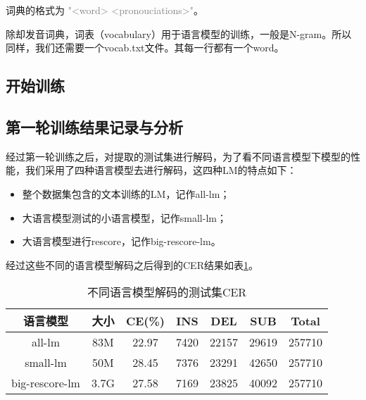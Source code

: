 词典的格式为 \textcolor{gray}{"<word> <pronouciations>"}。

除却发音词典，词表（vocabulary）用于语言模型的训练，一般是N-gram。所以同样，我们还需要一个vocab.txt文件。其每一行都有一个word。

\subsection{开始训练}



\subsection{第一轮训练结果记录与分析}
经过第一轮训练之后，对提取的测试集进行解码，为了看不同语言模型下模型的性能，我们采用了四种语言模型去进行解码，这四种LM的特点如下：
\begin{itemize}
	\item 整个数据集包含的文本训练的LM，记作all-lm；
	\item 大语言模型测试的小语言模型，记作small-lm；
	\item 大语言模型进行rescore，记作big-rescore-lm。
\end{itemize}

经过这些不同的语言模型解码之后得到的CER结果如表\ref{tab:lm-decoder}。
\begin{table}[h]
 \centering
 \caption{不同语言模型解码的测试集CER}
	 \begin{tabular*}{1\textwidth}{@{\extracolsep{\fill}}ccccccc}
	 \toprule
		{\bf 语言模型} & {\bf 大小} & {\bf CE(\%)} &{\bf INS} &{\bf DEL}  &{\bf SUB} &{\bf Total}\\
	 \midrule
	   all-lm         &  83M   & 22.97   &   7420 &   22157 & 29619  & 257710 \\
	   small-lm       &  50M   & 28.45   &   7376 &   23291 & 42650  & 257710 \\
	   big-rescore-lm &  3.7G  & 27.58   &   7169 &   23825 & 40092  & 257710 \\
	 \bottomrule
	 \end{tabular*}%
 \label{tab:lm-decoder}%
\end{table}%

